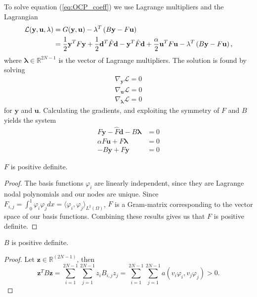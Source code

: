 To solve equation (\ref{eq:OCP_coeff}) we use Lagrange multipliers and the Lagrangian
\begin{align}
    \label{eq:OCP_lagrangian}
    \mathcal{L}(\mathbf{y, u, \lambda}) &= G(\mathbf{y, u}) - \mathbf{\lambda}^T \left( B\mathbf{y} - F\mathbf{u} \right) \\
    &= \frac{1}{2}\mathbf{y}^T F \mathbf{y} + \frac{1}{2}\mathbf{d}^T\Tilde{F} \mathbf{d} - \mathbf{y}^T\hat{F}\mathbf{d} + \frac{\alpha}{2}\mathbf{u}^T F \mathbf{u}  - \mathbf{\lambda}^T \left( B\mathbf{y} - F\mathbf{u} \right) ,
\end{align}
where $\mathbf{\lambda} \in \mathds{R}^{2N-1}$ is the vector of Lagrange multipliers.
The solution is found by solving
\begin{align}
    \label{eq:gradients}
    \nabla_{\mathbf{y}}\mathcal{L} = 0 \\
    \nabla_{\mathbf{u}}\mathcal{L} = 0 \\
    \nabla_{\mathbf{\mathbf{\lambda}}}\mathcal{L} = 0
\end{align}
for $\mathbf{y}$ and $\mathbf{u}$.
Calculating the gradients, and exploiting the symmetry of \( F \) and \( B \)
yields the system
\begin{align}
  F \mathbf{y}- \hat{F}\mathbf{d} - B\mathbf{\lambda} &= 0 \\
  \alpha F \mathbf{u}+ F\mathbf{\lambda} &= 0 \\
  -B \mathbf{y} + F \mathbf{y} &= 0
\end{align}

\begin{lemma}
    $F$ is positive definite.    
\end{lemma}
\begin{proof}
    \label{lemma:F_invertible}
    The basis functions $\varphi_i$ are linearly independent, since they are Lagrange nodal polynomials and our nodes are unique.
    Since $F_{i,j} = \int_0^1 \varphi_i \varphi_j dx = \langle \varphi_i, \varphi_j \rangle_{L^2(\Omega)}$,
    $F$ is a Gram-matrix corresponding to the vector space of our basis functions.
    Combining these results gives us that $F$ is positive definite.
\end{proof}

\begin{lemma}
    \label{lemma:B_pos_def}
    $B$ is positive definite.
\end{lemma}
\begin{proof}
    Let $\mathbf{z} \in \mathds{R}^{(2N-1)}$, then 
    $$\mathbf{z}^T B \mathbf{z} = \sum_{i=1}^{2N-1}\sum_{j=1}^{2N-1} z_i B_{i,j}z_j =\sum_{i=1}^{2N-1}\sum_{j=1}^{2N-1}a(v_i \varphi_i, v_j\varphi_j) >0 .$$
\end{proof}


